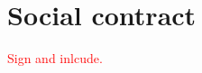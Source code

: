 \chapter{Social contract}
\makeatletter{}\makeatother
\label{appen:social_contract}
\textcolor{red}{Sign and inlcude.}
